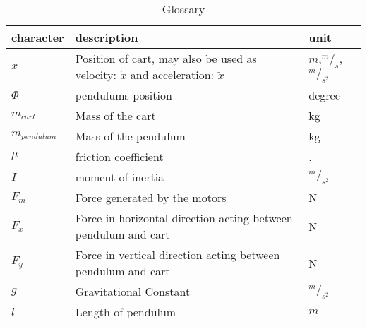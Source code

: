 \begin{table}[H]
\centering
\caption{Glossary }
\label{tab:glossary}
\begin{tabular}{|l|l|l|}
\hline
\rowcolor[HTML]{C0C0C0} 
character      & description                                                                            & unit                     \\ \hline
$x$            & Position of cart, may also be used as velocity: $\dot{x}$ and acceleration: $\ddot{x}$ & $m$,$^m/_s$, $^m/_{s^2}$ \\ \hline
$\Phi$         & pendulums position                                                                     & degree                   \\ \hline
$m_{cart}$     & Mass of the cart                                                                       & kg                       \\ \hline
$m_{pendulum}$ & Mass of the pendulum                                                                   & kg                       \\ \hline
$\mu$          & friction coefficient                                                                   & .                        \\ \hline
$I$            & moment of inertia                                                                      & $^m/_{s^2}$          \\ \hline
$F_m$          & Force generated by the motors                                                          & N                        \\ \hline
$F_x$          & Force in horizontal direction acting between pendulum and cart                         & N                        \\ \hline
$F_y$          & Force in vertical direction acting between pendulum and cart                           & N                        \\ \hline
$g$            & Gravitational Constant                                                                 & $^m/_{s^2}$          \\ \hline
$l$            & Length of pendulum                                                                     & $m$                      \\ \hline
\end{tabular}
\end{table}